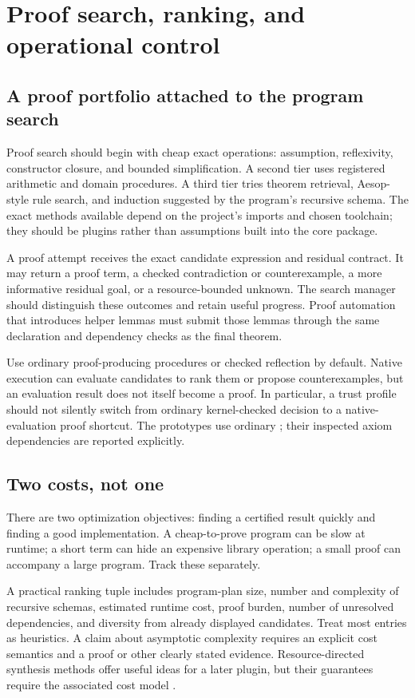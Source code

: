\documentclass[11pt,letterpaper]{article}
\newcommand{\code}[1]{\texttt{\detokenize{#1}}}
\theoremstyle{definition}
\theoremstyle{remark}
\begin{document}
\section{Proof search, ranking, and operational control}
\label{sec:operations}

\subsection{A proof portfolio attached to the program search}

Proof search should begin with cheap exact operations: assumption, reflexivity, constructor closure, and bounded simplification. A second tier uses registered arithmetic and domain procedures. A third tier tries theorem retrieval, Aesop-style rule search, and induction suggested by the program's recursive schema. The exact methods available depend on the project's imports and chosen toolchain; they should be plugins rather than assumptions built into the core package.

A proof attempt receives the exact candidate expression and residual contract. It may return a proof term, a checked contradiction or counterexample, a more informative residual goal, or a resource-bounded unknown. The search manager should distinguish these outcomes and retain useful progress. Proof automation that introduces helper lemmas must submit those lemmas through the same declaration and dependency checks as the final theorem.

Use ordinary proof-producing procedures or checked reflection by default. Native execution can evaluate candidates to rank them or propose counterexamples, but an evaluation result does not itself become a proof. In particular, a trust profile should not silently switch from ordinary kernel-checked decision to a native-evaluation proof shortcut. The prototypes use ordinary \code{decide}; their inspected axiom dependencies are reported explicitly.

\subsection{Two costs, not one}

There are two optimization objectives: finding a certified result quickly and finding a good implementation. A cheap-to-prove program can be slow at runtime; a short term can hide an expensive library operation; a small proof can accompany a large program. Track these separately.

A practical ranking tuple includes program-plan size, number and complexity of recursive schemas, estimated runtime cost, proof burden, number of unresolved dependencies, and diversity from already displayed candidates. Treat most entries as heuristics. A claim about asymptotic complexity requires an explicit cost semantics and a proof or other clearly stated evidence. Resource-directed synthesis methods offer useful ideas for a later plugin, but their guarantees require the associated cost model \cite{resyn}.
\end{document}

